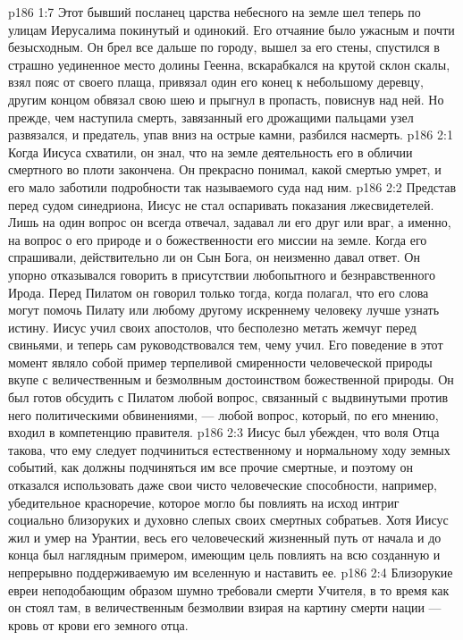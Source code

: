 \vs p186 1:7 Этот бывший посланец царства небесного на земле шел теперь по улицам Иерусалима покинутый и одинокий. Его отчаяние было ужасным и почти безысходным. Он брел все дальше по городу, вышел за его стены, спустился в страшно уединенное место долины Геенна, вскарабкался на крутой склон скалы, взял пояс от своего плаща, привязал один его конец к небольшому деревцу, другим концом обвязал свою шею и прыгнул в пропасть, повиснув над ней. Но прежде, чем наступила смерть, завязанный его дрожащими пальцами узел развязался, и предатель, упав вниз на острые камни, разбился насмерть.
\vs p186 2:1 Когда Иисуса схватили, он знал, что на земле деятельность его в обличии смертного во плоти закончена. Он прекрасно понимал, какой смертью умрет, и его мало заботили подробности так называемого суда над ним.
\vs p186 2:2 Представ перед судом синедриона, Иисус не стал оспаривать показания лжесвидетелей. Лишь на один вопрос он всегда отвечал, задавал ли его друг или враг, а именно, на вопрос о его природе и о божественности его миссии на земле. Когда его спрашивали, действительно ли он Сын Бога, он неизменно давал ответ. Он упорно отказывался говорить в присутствии любопытного и безнравственного Ирода. Перед Пилатом он говорил только тогда, когда полагал, что его слова могут помочь Пилату или любому другому искреннему человеку лучше узнать истину. Иисус учил своих апостолов, что бесполезно метать жемчуг перед свиньями, и теперь сам руководствовался тем, чему учил. Его поведение в этот момент являло собой пример терпеливой смиренности человеческой природы вкупе с величественным и безмолвным достоинством божественной природы. Он был готов обсудить с Пилатом любой вопрос, связанный с выдвинутыми против него политическими обвинениями, --- любой вопрос, который, по его мнению, входил в компетенцию правителя.
\vs p186 2:3 Иисус был убежден, что воля Отца такова, что ему следует подчиниться естественному и нормальному ходу земных событий, как должны подчиняться им все прочие смертные, и поэтому он отказался использовать даже свои чисто человеческие способности, например, убедительное красноречие, которое могло бы повлиять на исход интриг социально близоруких и духовно слепых своих смертных собратьев. Хотя Иисус жил и умер на Урантии, весь его человеческий жизненный путь от начала и до конца был наглядным примером, имеющим цель повлиять на всю созданную и непрерывно поддерживаемую им вселенную и наставить ее.
\vs p186 2:4 \pc Близорукие евреи неподобающим образом шумно требовали смерти Учителя, в то время как он стоял там, в величественным безмолвии взирая на картину смерти нации --- кровь от крови его земного отца.
